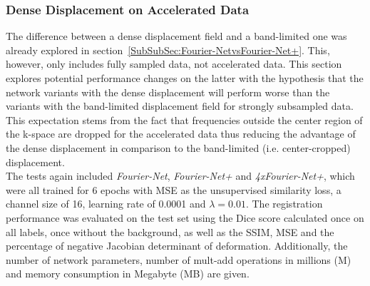 \documentclass[english,version-2022-01]{uzl-thesis} %
\begin{document}
\subsubsection{Dense Displacement on Accelerated Data} \label{SubSubSec:DenseDisplacementAcc}
The difference between a dense displacement field and a band-limited one was already explored in section~\ref{SubSubSec:Fourier-NetvsFourier-Net+}. This, however, only includes fully sampled data, not accelerated data. This section explores potential performance changes on the latter with the hypothesis that the network variants with the dense displacement will perform worse than the variants with the band-limited displacement field for strongly subsampled data. This expectation stems from the fact that frequencies outside the center region of the k-space are dropped for the accelerated data thus reducing the advantage of the dense displacement in comparison to the band-limited (i.e. center-cropped) displacement. \\
The tests again included \emph{Fourier-Net}, \emph{Fourier-Net+} and \emph{4xFourier-Net+}, which were all trained for 6 epochs with MSE as the unsupervised similarity loss, a channel size of 16, learning rate of 0.0001 and $\lambda=0.01$. The registration performance was evaluated on the test set using the Dice score calculated once on all labels, once without the background, as well as the SSIM, MSE and the percentage of negative Jacobian determinant of deformation. Additionally, the number of network parameters, number of mult-add operations in millions (M) and memory consumption in Megabyte (MB) are given.
\end{document}
